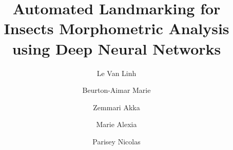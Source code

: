 \documentclass[review]{elsarticle}
\begin{document}
\begin{frontmatter}

\title{Automated Landmarking for Insects Morphometric Analysis using Deep Neural Networks}




\author[labri,inria]{Le Van Linh}
\author[labri]{Beurton-Aimar Marie}
\author[labri]{Zemmari Akka}
\author[igepp]{Marie Alexia}
\author[igepp]{Parisey Nicolas}


\address[labri]{LaBRI - University of Bordeaux, UMR 5800, 351, cours de la Liberation, 33405 Talence, France}
\address[igepp]{UMR 1349 IGEPP, BP 35327, 35653 Le Rheu, France}
\address[inria]{INRIA Bordeaux Sud-Ouest, 200, avenue de la Vieille Tour, 33405 Talence, France}



\end{frontmatter}
\end{document}
